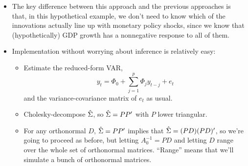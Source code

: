 \begin{itemize}
\item The key difference between this approach and the previous
  approaches is that, in this hypothetical example, we don't need to
  know which of the innovations actually line up with monetary policy
  shocks, since we know that (hypothetically) GDP growth has a
  nonnegative response to all of them.
\item Implementation without worrying about inference is relatively
  easy:
  \begin{itemize}
  \item Estimate the reduced-form VAR,
    \[ y_t = \Phi_0 + \sum_{j=1}^p \Phi_j y_{t-j} + e_t \]
    and the variance-covariance matrix of $e_t$ as usual.
  \item Cholesky-decompose $\hat{\Sigma}$, so $\hat{\Sigma} = PP'$ with $P$ lower
    triangular.
  \item For any orthonormal $D$, $\hat{\Sigma} = PP'$ implies that $\hat{\Sigma} =
    (PD)(PD)'$, so we're going to proceed as before, but letting
    $A_0^{-1} = PD$ and letting $D$ range over the whole set of
    orthonormal matrices.  ``Range'' means that we'll simulate a bunch of
    orthonormal matrices.


\end{itemize}
\end{itemize}
